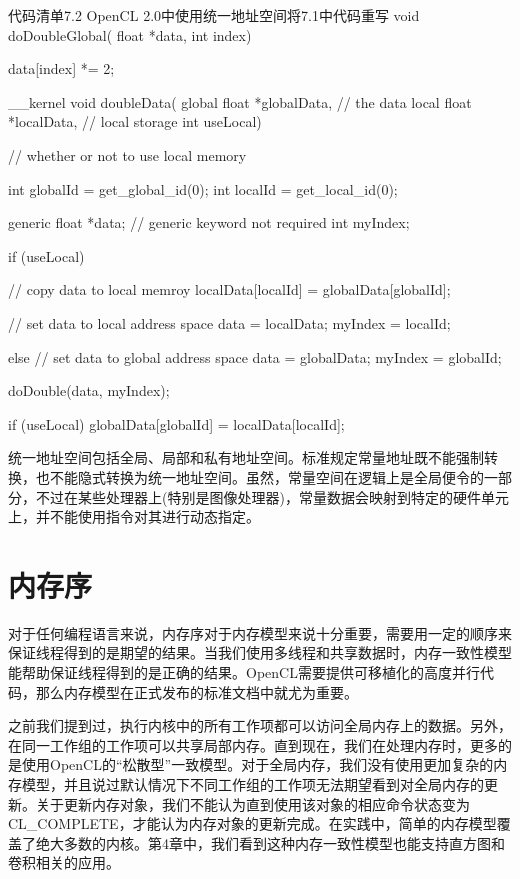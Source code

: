 \begin{codeboxt}[cpp]{代码清单7.2 OpenCL 2.0中使用统一地址空间将7.1中代码重写}
void doDoubleGlobal(
  float *data,
  int index){

  data[index] *= 2;
}

__kernel
void doubleData(
  global float *globalData, // the data
  local float *localData, // local storage
  int useLocal){ // whether or not to use local memory

  int globalId = get_global_id(0);
  int localId = get_local_id(0);

  generic float *data; // generic keyword not required
  int myIndex;

  if (useLocal){
    // copy data to local memroy
    localData[localId] = globalData[globalId];

    // set data to local address space
    data = localData;
    myIndex = localId;
  } else {
    // set data to global address space
    data = globalData;
    myIndex = globalId;
  }

  doDouble(data, myIndex);

  if (useLocal){
    globalData[globalId] = localData[localId];
  }
}
\end{codeboxt}

统一地址空间包括全局、局部和私有地址空间。标准规定常量地址既不能强制转换，也不能隐式转换为统一地址空间。虽然，常量空间在逻辑上是全局便令的一部分，不过在某些处理器上(特别是图像处理器)，常量数据会映射到特定的硬件单元上，并不能使用指令对其进行动态指定。



\section{内存序}

对于任何编程语言来说，内存序对于内存模型来说十分重要，需要用一定的顺序来保证线程得到的是期望的结果。当我们使用多线程和共享数据时，内存一致性模型能帮助保证线程得到的是正确的结果。OpenCL需要提供可移植化的高度并行代码，那么内存模型在正式发布的标准文档中就尤为重要。

之前我们提到过，执行内核中的所有工作项都可以访问全局内存上的数据。另外，在同一工作组的工作项可以共享局部内存。直到现在，我们在处理内存时，更多的是使用OpenCL的“松散型”一致模型。对于全局内存，我们没有使用更加复杂的内存模型，并且说过默认情况下不同工作组的工作项无法期望看到对全局内存的更新。关于更新内存对象，我们不能认为直到使用该对象的相应命令状态变为CL\_\allowbreak{}COMPLETE，才能认为内存对象的更新完成。在实践中，简单的内存模型覆盖了绝大多数的内核。第4章中，我们看到这种内存一致性模型也能支持直方图和卷积相关的应用。

